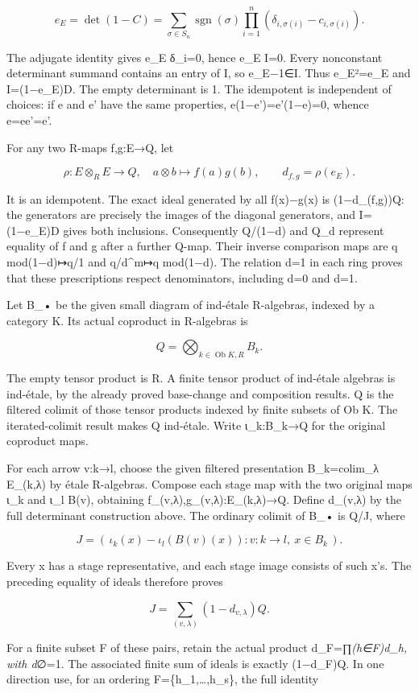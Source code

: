 \[
e_E=\det(1-C)
 =\sum_{\sigma\in S_n}\operatorname{sgn}(\sigma)
   \prod_{i=1}^n(\delta_{i,\sigma(i)}-c_{i,\sigma(i)}).
\]

The adjugate identity gives e\_E δ\_i=0, hence e\_E I=0. Every nonconstant determinant summand contains an entry of I, so e\_E−1∈I. Thus e\_E²=e\_E and I=(1−e\_E)D. The empty determinant is 1. The idempotent is independent of choices: if e and e' have the same properties, e(1−e')=e'(1−e)=0, whence e=ee'=e'.

For any two R-maps f,g:E→Q, let

\[
\rho:E\otimes_RE\to Q,\quad a\otimes b\mapsto f(a)g(b),
\qquad d_{f,g}=\rho(e_E).
\]

It is an idempotent. The exact ideal generated by all f(x)−g(x) is (1−d\_(f,g))Q: the generators are precisely the images of the diagonal generators, and I=(1−e\_E)D gives both inclusions. Consequently Q/(1−d) and Q\_d represent equality of f and g after a further Q-map. Their inverse comparison maps are q mod(1−d)↦q/1 and q/d\^{}m↦q mod(1−d). The relation d=1 in each ring proves that these prescriptions respect denominators, including d=0 and d=1.

Let B\_• be the given small diagram of ind-étale R-algebras, indexed by a category K. Its actual coproduct in R-algebras is

\[
Q=\bigotimes_{k\in\operatorname{Ob}K,R} B_k.
\]

The empty tensor product is R. A finite tensor product of ind-étale algebras is ind-étale, by the already proved base-change and composition results. Q is the filtered colimit of those tensor products indexed by finite subsets of Ob K. The iterated-colimit result makes Q ind-étale. Write ι\_k:B\_k→Q for the original coproduct maps.

For each arrow v:k→l, choose the given filtered presentation B\_k=colim\_λ E\_(k,λ) by étale R-algebras. Compose each stage map with the two original maps ι\_k and ι\_l B(v), obtaining f\_(v,λ),g\_(v,λ):E\_(k,λ)→Q. Define d\_(v,λ) by the full determinant construction above. The ordinary colimit of B\_• is Q/J, where

\[
J=(\,\iota_k(x)-\iota_l(B(v)(x)):
                    v:k\to l,\ x\in B_k\,).
\]

Every x has a stage representative, and each stage image consists of such x's. The preceding equality of ideals therefore proves

\[
J=\sum_{(v,\lambda)}(1-d_{v,\lambda})Q.
\]

For a finite subset F of these pairs, retain the actual product d\_F=∏\emph{(h∈F)d\_h, with d}∅=1. The associated finite sum of ideals is exactly (1−d\_F)Q. In one direction use, for an ordering F=\{h\_1,\ldots,h\_s\}, the full identity

